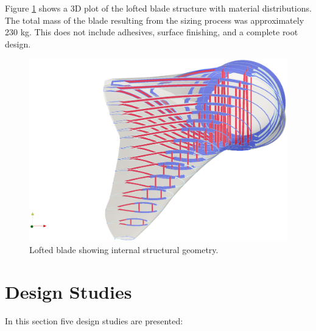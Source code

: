 Figure \ref{fig:loftedstructure_baseline} shows a 3D plot of the lofted blade structure with material distributions.
The total mass of the blade resulting from the sizing process was approximately 230 kg.
This does not include adhesives, surface finishing, and a complete root design.

\begin{figure}[!ht]
\begin{center}
	\includegraphics[width=1\linewidth]{figures/loftedbladestructure_basic_sizing.eps}
\end{center}
\caption{Lofted blade showing internal structural geometry.}
\label{fig:loftedstructure_baseline}
\end{figure}

\clearpage
\section{Design Studies}
\label{sec:design_studies}

In this section five design studies are presented:

